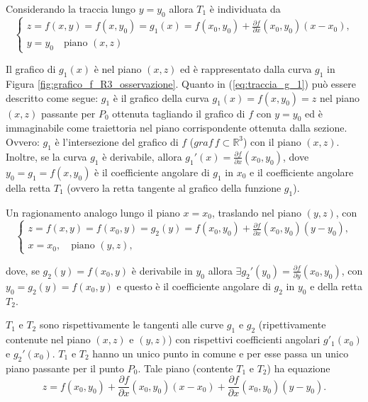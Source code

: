 Considerando la traccia lungo $y=y_0$ allora $T_1$ è individuata da
\begin{equation}\label{eq:traccia_g_1}
    \begin{cases}
        z=f(x,y)=f(x,y_0)=g_1(x) = f(x_0,y_0) + \frac{\partial f}{\partial x} (x_0,y_0) (x-x_0),\\
        y=y_0\quad \text{piano }(x,z)
    \end{cases}
\end{equation}

Il grafico di $g_1(x)$ è nel piano $(x,z)$ ed è rappresentato dalla curva $g_1$ in Figura \ref{fig:grafico_f_R3_osservazione}. Quanto in (\ref{eq:traccia_g_1}) può essere descritto come segue: $g_1$ è il grafico della curva $g_1(x)=f(x,y_0)=z$ nel piano $(x,z)$ passante per $P_0$ ottenuta tagliando il grafico di $f$ con $y=y_0$ ed è immaginabile come traiettoria nel piano corrispondente ottenuta dalla sezione. Ovvero: $g_1$ è l'intersezione del grafico di $f$ ($graf\, f\subset\mathbb R^3$) con il piano $(x,z)$. Inoltre, se la curva $g_1$ è derivabile, allora $g_1'(x)=\frac{\partial f}{\partial x}(x_0,y_0)$, dove $y_0=g_1=f(x,y_0)$ è il coefficiente angolare di $g_1$ in $x_0$ e il coefficiente angolare della retta $T_1$ (ovvero la retta tangente al grafico della funzione $g_1$).

Un ragionamento analogo lungo il piano $x=x_0$, traslando nel piano $(y,z)$, con
\begin{equation}\label{eq:traccia_g_2}
	\begin{cases}
		z=f(x,y)=f(x_0,y)=g_2(y) = f(x_0,y_0) + \frac{\partial f}{\partial x} (x_0,y_0) (y-y_0),\\
		x=x_0,\quad \text{piano } (y,z),
	\end{cases}
\end{equation}

dove, se $g_2(y)=f(x_0,y)$ è derivabile in $y_0$ allora $\exists g_2'(y_0)=\frac{\partial f}{\partial y}(x_0,y_0)$, con $y_0=g_2(y)=f(x_0,y)$ e questo è il coefficiente angolare di $g_2$ in $y_0$ e della retta $T_2$.

$T_1$ e $T_2$ sono rispettivamente le tangenti alle curve $g_1$ e $g_2$ (ripettivamente contenute nel piano $(x,z)$ e $(y,z)$) con rispettivi coefficienti angolari $g'_1(x_0)$ e $g_2'(x_0)$. $T_1$ e $T_2$ hanno un unico punto in comune e per esse passa un unico piano passante per il punto $P_0$. Tale piano (contente $T_1$ e $T_2$) ha equazione
 \begin{equation}\label{eq:piano_tangente_due_variabili}
 	z=f(x_0,y_0) + \frac{\partial f}{\partial x} (x_0,y_0) (x-x_0) + \frac{\partial f}{\partial x} (x_0,y_0) (y-y_0).
 \end{equation}

